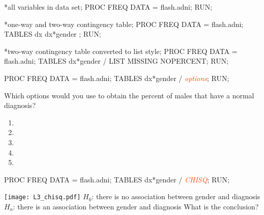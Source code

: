 \begin{frame}[fragile]
\footnotesize
\begin{code}{.0}
*all variables in data set;
PROC FREQ DATA = flash.adni; RUN;

*one-way and two-way contingency table;
PROC FREQ DATA = flash.adni;
    TABLES dx dx*gender ;
RUN;

*two-way contingency table converted to list style;
PROC FREQ DATA = flash.adni;
    TABLES dx*gender / LIST MISSING NOPERCENT;
RUN;
\end{code}
\emp
\end{frame}


\begin{frame}[fragile]
\fto
{}
\footnotesize
\begin{code}{.0}
PROC FREQ DATA = flash.adni;
    TABLES dx*gender / \textcolor{OrangeRed}{\emph{options}};
RUN;
\end{code}
\emp
\begin{clicker}{Which options would you use to obtain the percent of males that have a normal diagnosis?}
\begin{enumerate}
\item {}
\item {}
\item {}
\item {}
\item {}
\end{enumerate}
\end{clicker}
\end{frame}

\begin{frame}[fragile]
\footnotesize
\begin{code}{.0}
PROC FREQ DATA = flash.adni;
    TABLES dx*gender / \textcolor{OrangeRed}{\emph{CHISQ}};
RUN;
\end{code}
\emp
{} \hspace{1in} \emp
{}
\texttt{[image: L3\_chisq.pdf]}
\emp
\vskip10pt
$H_0$: there is no association between gender and diagnosis \\
$H_a$: there is an association between gender and diagnosis
\vskip10pt
\oyo What is the conclusion?
\end{frame}

